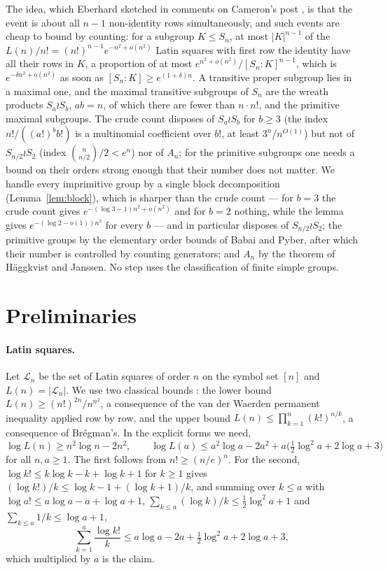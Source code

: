 \documentclass[11pt]{amsart}
\theoremstyle{plain}
\theoremstyle{remark}
\newcommand{\LL}{\mathcal{L}}
\begin{document}
The idea, which Eberhard sketched in comments on Cameron's post
\cite{Cam15}, is that the event is about all $n-1$ non-identity rows
simultaneously, and such events are cheap to bound by counting: for a
subgroup $K\le S_n$, at most $|K|^{n-1}$ of the $L(n)/n!=(n!)^{n-1}e^{-n^2+o(n^2)}$
Latin squares with first row the identity have all their rows in $K$,
a proportion of at most $e^{n^2+o(n^2)}/[S_n:K]^{n-1}$, which is
$e^{-\delta n^2+o(n^2)}$ as soon as $[S_n:K]\ge e^{(1+\delta)n}$.  A
transitive proper subgroup lies in a maximal one, and the maximal
transitive subgroups of $S_n$ are the wreath products $S_a\wr S_b$,
$ab=n$, of which there are fewer than $n\cdot n!$, and the primitive
maximal subgroups.  The crude count disposes of $S_a\wr S_b$ for
$b\ge3$ (the index $n!/((a!)^bb!)$ is a multinomial coefficient over
$b!$, at least $3^n/n^{O(1)}$) but not of $S_{n/2}\wr S_2$
(index $\binom n{n/2}/2<e^n$) nor of $A_n$; for the primitive
subgroups one needs a bound on their orders strong enough that their
number does not matter.  We
handle every imprimitive group by a single block decomposition
(Lemma~\ref{lem:block}), which is sharper than the crude count ---
for $b=3$ the crude count gives $e^{-(\log3-1)n^2+o(n^2)}$ and for
$b=2$ nothing, while the lemma gives $e^{-(\log2-o(1))n^2}$ for every
$b$ --- and in particular disposes of $S_{n/2}\wr S_2$; the primitive groups by
the elementary order bounds of Babai and Pyber, after which their number
is controlled by counting generators; and $A_n$ by the theorem of
H\"aggkvist and Janssen.  No step uses the classification of finite
simple groups.

\section{Preliminaries}\label{sec:prelim}

\paragraph{Latin squares.}  Let $\LL_n$ be the set of Latin squares of
order $n$ on the symbol set $[n]$ and $L(n)=|\LL_n|$.  We use two
classical bounds \cite[Ch.~17]{vLW}: the lower bound
$L(n)\ge(n!)^{2n}/n^{n^2}$, a consequence of the van der Waerden
permanent inequality applied row by row, and the upper bound
$L(n)\le\prod_{k=1}^n(k!)^{n/k}$, a consequence of Br\'egman's.  In the
explicit forms we need,
\begin{equation}\label{eq:L}
\log L(n)\ge n^2\log n-2n^2,\qquad
\log L(a)\le a^2\log a-2a^2+a\bigl(\tfrac12\log^2a+2\log a+3\bigr)
\end{equation}
for all $n,a\ge1$.  The first follows from $n!\ge(n/e)^n$.  For the
second, $\log k!\le k\log k-k+\log k+1$ for $k\ge1$ gives
$(\log k!)/k\le\log k-1+(\log k+1)/k$, and summing over $k\le a$ with
$\log a!\le a\log a-a+\log a+1$, $\sum_{k\le a}(\log k)/k\le\frac12\log^2a+1$
and $\sum_{k\le a}1/k\le\log a+1$,
\[
\sum_{k=1}^a\frac{\log k!}k\le a\log a-2a+\tfrac12\log^2a+2\log a+3,
\]
which multiplied by $a$ is the claim.
\end{document}
